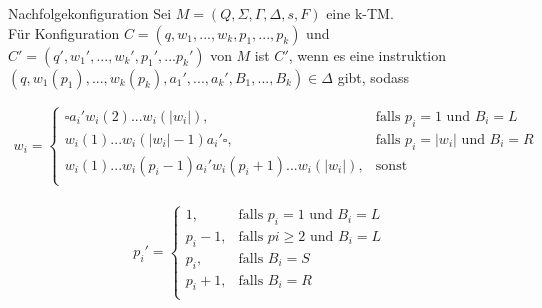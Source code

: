 \begin{defn}{Nachfolgekonfiguration}
    Sei $M = (Q, \Sigma, \Gamma, \Delta, s, F)$ eine k-TM. \\

    Für Konfiguration $C=(q,w_1,...,w_k,p_1,...,p_k)$ und $C' = (q', w_1',...,w_k',p_1',...p_k')$ von $M$ ist $C'$, 
    wenn es eine instruktion $(q, w_1(p_1),...,w_k(p_k),a_1',...,a_k',B_1,...,B_k) \in \Delta$ gibt, sodass

    \begin{align*}  
        w_i =
        \begin{cases} 
            \square a_i' w_i(2) ... w_i(| w_i |), & \text{falls }p_i = 1 \text{ und }  B_i = L \\ 
            w_i(1) ... w_i(|w_i| -1) a_i' \square, & \text{falls }p_i = |w_i| \text{ und } B_i = R\\ 
            w_i(1)...w_i(p_i -1) a_i' w_i(p_i +1)...w_i(| w_i |), &\text{sonst} \\
        \end{cases}
    \end{align*}

    \begin{align*}  
        p_i' =
        \begin{cases} 
            1, & \text{falls } p_i = 1  \text{ und } B_i = L \\ 
            p_i -1, & \text{falls } pi \geq 2 \text{ und } B_i = L \\
            p_i, & \text{falls } B_i = S \\
            p_i + 1, & \text{falls } B_i = R \\
        \end{cases}
    \end{align*}
\end{defn}